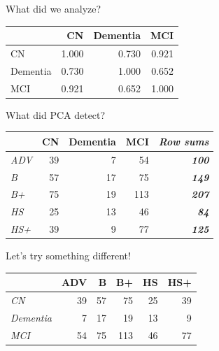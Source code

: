 \documentclass[
  ignorenonframetext,
]{beamer}
\begin{document}
\begin{frame}{What did we analyze?}
\protect\hypertarget{what-did-we-analyze}{}

\begin{table}[H]
\centering
\begin{tabular}{lrrr}
\toprule
  & CN & Dementia & MCI\\
\midrule
CN & 1.000 & 0.730 & 0.921\\
Dementia & 0.730 & 1.000 & 0.652\\
MCI & 0.921 & 0.652 & 1.000\\
\bottomrule
\end{tabular}
\end{table}

\end{frame}

\begin{frame}{What did PCA detect?}
\protect\hypertarget{what-did-pca-detect}{}

\begin{table}[H]
\centering
\begin{tabular}{>{\em}lrrr>{\bfseries\em}r}
\toprule
  & CN & Dementia & MCI & Row sums\\
\midrule
ADV & 39 & 7 & 54 & 100\\
B & 57 & 17 & 75 & 149\\
B+ & 75 & 19 & 113 & 207\\
HS & 25 & 13 & 46 & 84\\
HS+ & 39 & 9 & 77 & 125\\
\bottomrule
\end{tabular}
\end{table}

\end{frame}

\begin{frame}{Let's try something different!}
\protect\hypertarget{lets-try-something-different}{}

\begin{table}[H]
\centering
\begin{tabular}{>{\em}lrrrrr}
\toprule
  & ADV & B & B+ & HS & HS+\\
\midrule
CN & 39 & 57 & 75 & 25 & 39\\
Dementia & 7 & 17 & 19 & 13 & 9\\
MCI & 54 & 75 & 113 & 46 & 77\\
\bottomrule
\end{tabular}
\end{table}

\end{frame}
\end{document}
